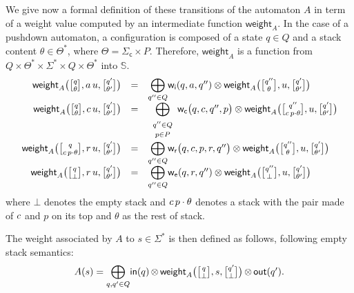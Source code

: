 \documentclass[runningheads]{llncs}
\newcommand{\Semiring}{\mathbb{S}}
\def\weight{\mathsf{weight}}
\def\wei{\mathsf{w}}
\newcommand{\call}[1]{\ensuremath #1} %
\newcommand{\return}[1]{\ensuremath #1} %
\def\Sigmac{{\Sigma_\mathsf{c}}}
\def\weii{{\wei_\mathsf{i}}}
\def\weic{{\wei_\mathsf{c}}}
\def\weir{{\wei_\mathsf{r}}}
\def\weie{{\wei_\mathsf{e}}}
\newcommand{\config}[2]{\ensuremath \genfrac{[}{]}{0pt}{}{#1}{#2}}
\begin{document}
We give now a formal definition of these transitions of the automaton $A$
in term of a weight value
computed by an intermediate function $\weight_A$.
In the case of a pushdown automaton, a configuration is composed 
of a state $q \in Q$ and a stack content $\theta \in \Theta^*$, where $\Theta = \Sigmac \times P$.
Therefore, $\weight_A$ is a function from 
$Q \times \Theta^* \times \Sigma^* \times Q \times \Theta^*$ into $\Semiring$.
\[
\begin{array}{rcl}
\weight_A\bigl(\config{q}{\theta}, a\, u, \config{q'}{\theta'}\bigr) & = & 
 {\displaystyle\bigoplus_{q'' \in Q}} \weii(q, a, q'') 
 \otimes \weight_A\bigl(\config{q''}{\theta}, u, \config{q'}{\theta'}\bigr)\\
%
\weight_A\bigl(\config{q}{\theta}, {\call{c}}\, u, \config{q'}{\theta'}\bigr) & = & 
 {\displaystyle\bigoplus_{\begin{array}{c}
                          \scriptstyle q'' \in Q\\[-2pt]
                          \scriptstyle p \in P
                          \end{array}}}
 \weic\bigl(q, {\call{c}}, q'', p\bigr) 
 \otimes \weight_A\bigl(\config{q''}{{\call{c}}\, p\cdot \theta}, u, \config{q'}{\theta'}\bigr)\\[1mm]
%
\weight_A\bigl(\config{q}{{\call{c}}\, p\cdot \theta}, {\return{r}}\, u, \config{q'}{\theta'}\bigr) & = & 
 {\displaystyle\bigoplus_{q'' \in Q}} 
 \weir\bigl(q, {\call{c}}, p, {\return{r}}, q''\bigr) 
 \otimes \weight_A\bigl(\config{q''}{\theta}, u, \config{q'}{\theta'}\bigr)\\
%
\weight_A\bigl(\config{q}{\bot}, {\return{r}}\, u, \config{q'}{\theta'}\bigr) & = & 
 {\displaystyle\bigoplus_{q'' \in Q}} \weie(q, {\return{r}}, q'') 
 \otimes \weight_A\bigl(\config{q''}{\bot}, u, \config{q'}{\theta'}\bigr)\\
\end{array}
\]
where $\bot$ denotes the empty stack and ${\call{c}}\, p\cdot \theta$ 
denotes a stack with the pair made of ${\call{c}}$ and $p$ on its top and $\theta$
as the rest of stack.

\noindent
The weight associated by $A$ to $s \in \Sigma^*$
is then defined as follows,
following empty stack semantics: 
\begin{equation}
A(s)  = 
{\displaystyle\bigoplus_{q, q' \in Q}} \textstyle
\mathsf{in}(q) \mathop{\otimes} 
\weight_A\bigl(\config{q}{\bot}, s, \config{q'}{\bot}\bigr) 
\mathop{\otimes} \mathsf{out}(q').
\label{eq:weightA}
\end{equation}
\end{document}
